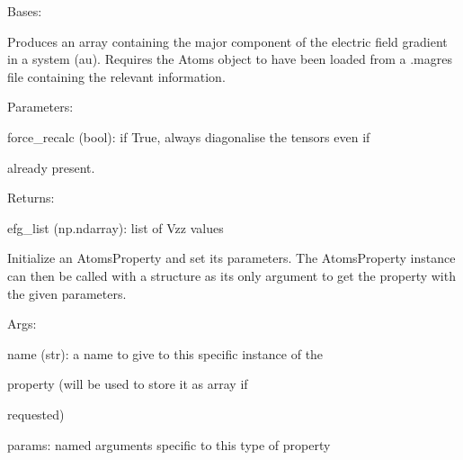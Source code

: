 \documentclass[letterpaper,10pt,english]{sphinxmanual}
\begin{document}
\begin{fulllineitems}
\label{doctree/soprano.properties.nmr.efg:soprano.properties.nmr.efg.EFGVzz}
Bases: {\hyperref[doctree/soprano.properties.atomsproperty:soprano.properties.atomsproperty.AtomsProperty]{}}

Produces an array containing the major component of the electric field
gradient in a system (au).
Requires the Atoms object to have been loaded from a .magres file
containing the relevant information.

\begin{DUlineblock}{0em}
\item[] Parameters:
\item[]
\begin{DUlineblock}{\DUlineblockindent}
\item[] force\_recalc (bool): if True, always diagonalise the tensors even if
\item[]
\begin{DUlineblock}{\DUlineblockindent}
\item[] already present.
\end{DUlineblock}
\end{DUlineblock}
\end{DUlineblock}

\begin{DUlineblock}{0em}
\item[] Returns:
\item[]
\begin{DUlineblock}{\DUlineblockindent}
\item[] efg\_list (np.ndarray): list of Vzz values
\end{DUlineblock}
\end{DUlineblock}

Initialize an AtomsProperty and set its parameters.
The AtomsProperty instance can then be called with a structure as its
only argument to get the property with the given parameters.

\begin{DUlineblock}{0em}
\item[] Args:
\item[]
\begin{DUlineblock}{\DUlineblockindent}
\item[] name (str): a name to give to this specific instance of the
\item[]
\begin{DUlineblock}{\DUlineblockindent}
\item[] property (will be used to store it as array if
\item[] requested)
\end{DUlineblock}
\item[] params: named arguments specific to this type of property
\end{DUlineblock}
\end{DUlineblock}


\end{fulllineitems}
\end{document}
